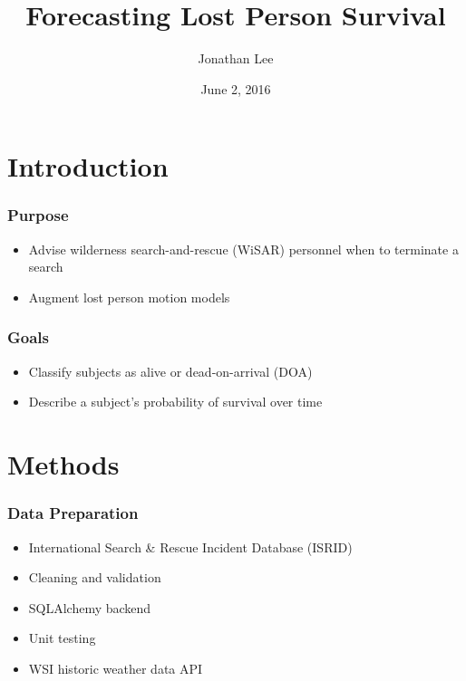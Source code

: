\documentclass[serif,final,bigger]{beamer}
\title{Forecasting Lost Person Survival}
\author{Jonathan Lee}
\institute{TJHSST Computer Systems Lab}
\date{June 2, 2016}
\begin{document}
  \begin{frame}
    \titlepage
  \end{frame}
  \usebackgroundtemplate{}

  \section{Introduction}

  \begin{frame}
    \frametitle{Purpose}
    \begin{itemize}
      \item Advise wilderness search-and-rescue (WiSAR) personnel when to terminate a search
      \item Augment lost person motion models
    \end{itemize}
  \end{frame}

  \begin{frame}
    \frametitle{Goals}
    \begin{itemize}
      \item Classify subjects as alive or dead-on-arrival (DOA)
      \item Describe a subject's probability of survival over time
    \end{itemize}
  \end{frame}

  \section{Methods}

  \begin{frame}
    \frametitle{Data Preparation}
    \begin{itemize}
      \item International Search \& Rescue Incident Database (ISRID)
      \item Cleaning and validation
      \item SQLAlchemy backend
      \item Unit testing
      \item WSI historic weather data API
    \end{itemize}
  \end{frame}
\end{document}
